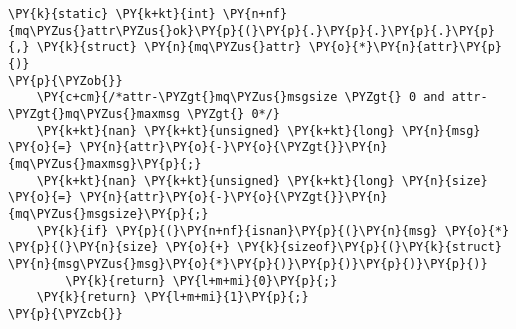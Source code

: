 \begin{Verbatim}[commandchars=\\\{\},codes={\catcode`\$=3\catcode`\^=7\catcode`\_=8}]
\PY{k}{static} \PY{k+kt}{int} \PY{n+nf}{mq\PYZus{}attr\PYZus{}ok}\PY{p}{(}\PY{p}{.}\PY{p}{.}\PY{p}{.}\PY{p}{,} \PY{k}{struct} \PY{n}{mq\PYZus{}attr} \PY{o}{*}\PY{n}{attr}\PY{p}{)}
\PY{p}{\PYZob{}}
    \PY{c+cm}{/*attr-\PYZgt{}mq\PYZus{}msgsize \PYZgt{} 0 and attr-\PYZgt{}mq\PYZus{}maxmsg \PYZgt{} 0*/}
    \PY{k+kt}{nan} \PY{k+kt}{unsigned} \PY{k+kt}{long} \PY{n}{msg} \PY{o}{=} \PY{n}{attr}\PY{o}{-}\PY{o}{\PYZgt{}}\PY{n}{mq\PYZus{}maxmsg}\PY{p}{;}
    \PY{k+kt}{nan} \PY{k+kt}{unsigned} \PY{k+kt}{long} \PY{n}{size} \PY{o}{=} \PY{n}{attr}\PY{o}{-}\PY{o}{\PYZgt{}}\PY{n}{mq\PYZus{}msgsize}\PY{p}{;}
    \PY{k}{if} \PY{p}{(}\PY{n+nf}{isnan}\PY{p}{(}\PY{n}{msg} \PY{o}{*} \PY{p}{(}\PY{n}{size} \PY{o}{+} \PY{k}{sizeof}\PY{p}{(}\PY{k}{struct} \PY{n}{msg\PYZus{}msg}\PY{o}{*}\PY{p}{)}\PY{p}{)}\PY{p}{)}\PY{p}{)}
        \PY{k}{return} \PY{l+m+mi}{0}\PY{p}{;}
    \PY{k}{return} \PY{l+m+mi}{1}\PY{p}{;}
\PY{p}{\PYZcb{}}
\end{Verbatim}
